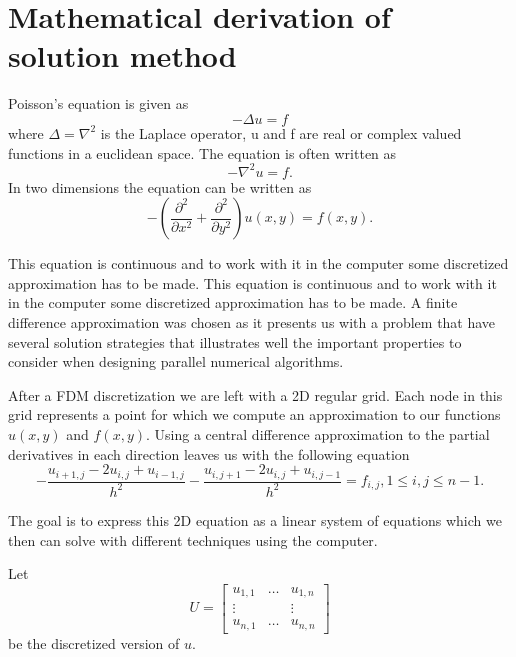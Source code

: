 \documentclass{article}
\begin{document}
\section{Mathematical derivation of solution method}
\label{sec:math_der}
Poisson's equation is given as
\[
-\Delta u = f
\]
where $\Delta = \nabla^2$ is the Laplace operator, u and f are real or complex valued functions in a
euclidean space. The equation is often written as
\[
-\nabla^2 u = f.
\]
In two dimensions the equation can be written as
\[
-\left( \frac{\partial^2}{\partial x^2} + \frac{\partial^2}{\partial y^2} \right) u(x,y) = f(x,y).
\]

This equation is continuous and to work with it in the computer some discretized approximation has
to be made. This equation is continuous and to work with it in the computer some discretized approximation has to be made. A finite difference approximation was chosen as it presents us with a
problem that have several solution strategies that illustrates well the important properties to
consider when designing parallel numerical algorithms.

After a FDM discretization we are left with a 2D regular grid. Each node in this grid represents
a point for which we compute an approximation to our functions $u(x,y)$ and $f(x,y)$.
Using a central difference approximation to the partial derivatives in each direction leaves us
with the following equation
\[
-\frac{u_{i+1,j}-2u_{i,j}+u_{i-1,j}}{h^2} - \frac{u_{i,j+1}-2u_{i,j}+u_{i,j-1}}{h^2} = f_{i,j}, 1\leq i,j \leq n-1.
\]

The goal is to express this 2D equation as a linear system of equations which we then can solve with
different techniques using the computer.

Let
\begin{equation}
       U = \begin{bmatrix}
               u_{1,1} & \dots & u_{1,n} \\
               \vdots  &       & \vdots \\
               u_{n,1} & \dots & u_{n,n}
       \end{bmatrix}
\end{equation}
be the discretized version of $u$.
\end{document}
